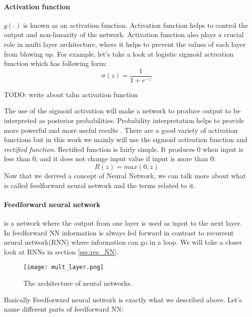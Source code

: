 \paragraph{Activation function} $g(\cdot)$ is known as an activation function.
Activation function helps to control the output and non-linearity of the network.
Activation function also plays a crucial role in multi layer architecture, where it helps
to prevent the values of each layer from blowing up.
For example, let's take a look at logistic sigmoid activation function which has
following form:
\begin{equation} \label{sigmoid_function}
	\sigma(z) = \frac{1}{1 + e^{-z}}
\end{equation}

TODO: write about tahn activation function

The use of the sigmoid activation will make a network to produce output to be
interpreted as posterior probabilities. Probability interpretation helps to provide
more powerful and more useful results \cite{Bishop1995}. There are a good variety
of activation functions but in this work we mainly will use the sigmoid activation function
and \emph{rectified function}. Rectified function is fairly simple.
It produces $0$ when input is less than $0$, and it does not change input value if
input is more than 0:
\begin{equation} \label{rect_function}
	R(z) = max(0, z)
\end{equation}
Now that we derived a concept of Neural Network, we can talk more about
what is called feedforward neural network and the terms related to it.
\paragraph{Feedforward neural network} is a network where the output
from one layer is used as input to the next layer. In feedforward NN
information is always fed forward in contrast to recurrent neural network(RNN)
where information can go in a loop. We will take a closer look at RNNs in section
\autoref{sec:rec_NN}.

\begin{figure}[H]
	\texttt{[image: mult\_layer.png]}
	\caption{The architecture of neural networks\cite{Nielsen2015}.} %
	\label{img:mult_layer} %
\end{figure}

Basically Feedforward neural network is exactly
what we described above. Let's name different parts of feedforward NN:

